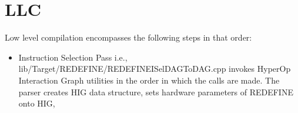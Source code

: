 \documentclass[12pt]{article}
\begin{document}
\section{LLC}
Low level compilation encompasses the following steps in that order:
\begin{itemize}
 \item Instruction Selection Pass i.e., lib/Target/REDEFINE/REDEFINEISelDAGToDAG.cpp invokes HyperOp Interaction Graph utilities in the order in which the calls are made. The parser creates HIG data structure, sets hardware parameters of REDEFINE onto HIG, 
\end{itemize}
\end{document}
